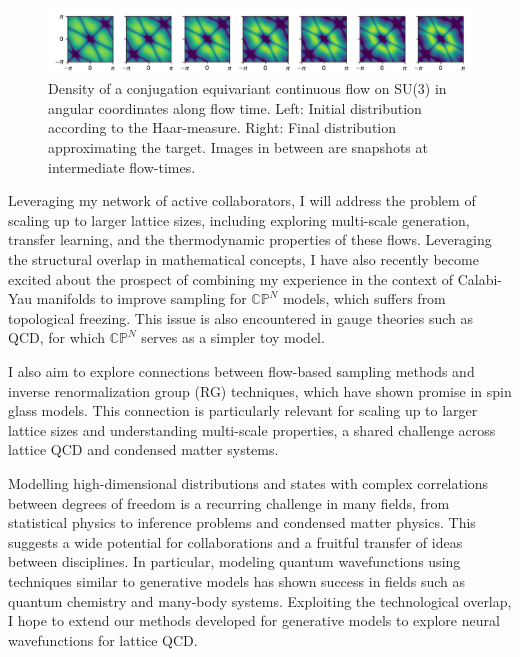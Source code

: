 \documentclass[11pt]{article}
\begin{document}
\begin{figure}
    \centering
    \includegraphics[width=\linewidth]{su3.pdf}
    \vspace{-25pt}
    \caption{ Density of a conjugation equivariant continuous flow on SU(3) in angular coordinates along flow time. Left: Initial distribution according to the Haar-measure. Right: Final distribution approximating the target. Images in between are snapshots at intermediate flow-times.}
    \label{fig:su3}
    \vspace{-10pt}
\end{figure}

\textbf{\color{royalblue}{Future Directions.}}
Leveraging my network of active collaborators, I will address the problem of scaling up to larger lattice sizes, including exploring multi-scale generation, transfer learning, and the thermodynamic properties of these flows. Leveraging the structural overlap in mathematical concepts, I have also recently become excited about the prospect of combining my experience in the context of Calabi-Yau manifolds to improve sampling for $\mathbb{CP}^N$ models, which suffers from topological freezing. This issue is also encountered in gauge theories such as QCD, for which $\mathbb{CP}^N$ serves as a simpler toy model.

I also aim to explore connections between flow-based sampling methods and inverse renormalization group (RG) techniques, which have shown promise in spin glass models. This connection is particularly relevant for scaling up to larger lattice sizes and understanding multi-scale properties, a shared challenge across lattice QCD and condensed matter systems.

Modelling high-dimensional distributions and states with complex correlations between degrees of freedom is a recurring challenge in many fields, from statistical physics to inference problems and condensed matter physics.
This suggests a wide potential for collaborations and a fruitful transfer of ideas between disciplines.
In particular, modeling quantum wavefunctions using techniques similar to generative models has shown success in fields such as quantum chemistry and many-body systems. Exploiting the technological overlap, I hope to extend our methods developed for generative models to explore neural wavefunctions for lattice QCD.
\end{document}
